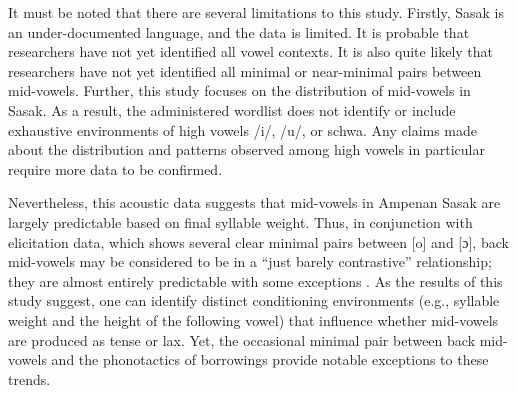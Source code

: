 \documentclass[12pt]{ouparticle}
\begin{document}

It must be noted that there are several limitations to this study. Firstly, Sasak is an under-documented language, and the data is limited. It is probable that researchers have not yet identified all vowel contexts. It is also quite likely that researchers have not yet identified all minimal or near-minimal pairs between mid-vowels.  Further, this study focuses on the distribution of mid-vowels in Sasak. As a result, the administered wordlist does not identify or include exhaustive environments of high vowels /i/, /u/, or schwa. Any claims made about the distribution and patterns observed among high vowels in particular require more data to be confirmed. 

Nevertheless, this acoustic data suggests that mid-vowels in Ampenan Sasak are largely predictable based on final syllable weight. Thus, in conjunction with elicitation data, which shows several clear minimal pairs between [o] and [ɔ], back mid-vowels may be considered to be in a ``just barely contrastive'' relationship; they are almost entirely predictable with some exceptions \citep[10]{goldsmith1995}. As the results of this study suggest, one can identify distinct conditioning environments (e.g., syllable weight and the height of the following vowel) that influence whether mid-vowels are produced as tense or lax. Yet, the occasional minimal pair between back mid-vowels and the phonotactics of borrowings provide notable exceptions to these trends. 
\end{document}
